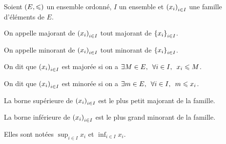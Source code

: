 \begin{defi}
Soient \(\left(E,\leqslant\right)\) un ensemble ordonné, \(I\) un ensemble et \(\left(x_i\right)_{i\in I}\) une famille d'éléments de \(E\).

On appelle majorant de \(\left(x_i\right)_{i\in I}\) tout majorant de \(\left\lbrace x_i\right\rbrace_{i\in I}\).

On appelle minorant de \(\left(x_i\right)_{i\in I}\) tout minorant de \(\left\lbrace x_i\right\rbrace_{i\in I}\).

On dit que \(\left(x_i\right)_{i\in I}\) est majorée si on a \(\quantifs{\exists M\in E;\forall i\in I}x_i\leq M\).

On dit que \(\left(x_i\right)_{i\in I}\) est minorée si on a \(\quantifs{\exists m\in E;\forall i\in I}m\leq x_i\).

La borne supérieure de \(\left(x_i\right)_{i\in I}\) est le plus petit majorant de la famille.

La borne inférieure de \(\left(x_i\right)_{i\in I}\) est le plus grand minorant de la famille.

Elles sont notées \(\sup_{i\in I}x_i\) et \(\inf_{i\in I}x_i\).
\end{defi}